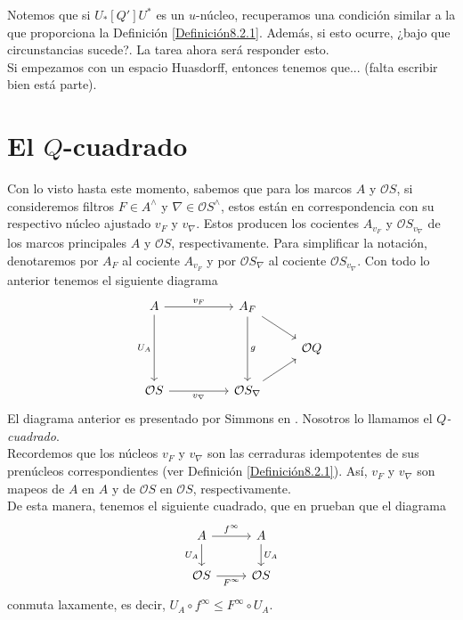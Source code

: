 Notemos que si $U_*[Q']U^*$ es un $u$-núcleo, recuperamos una condición similar a la que proporciona la Definición \ref{Definición8.2.1}. Además, si esto ocurre, ¿bajo que circunstancias 
sucede?. La tarea ahora será responder esto.\\

Si empezamos con un espacio Huasdorff, entonces tenemos que... (falta escribir bien está parte).

\section{El $Q$-cuadrado}\label{Qcuadrado}

Con lo visto hasta este momento, sabemos que para los marcos $A$ y $\mathcal{O}S$, si consideremos filtros $F\in A^\wedge$ y $\nabla\in \mathcal{O}S^\wedge$, estos están en correspondencia con su respectivo núcleo ajustado
$v_F$ y $v_\nabla$. Estos producen los cocientes $A_{v_F}$ y $\mathcal{O}S_{v_\nabla}$ de los marcos principales $A$ y $\mathcal{O}S$, respectivamente. Para simplificar la notación, denotaremos por $A_F$ al cociente $A_{v_F}$ 
y por $\mathcal{O}S_\nabla$ al cociente $\mathcal{O}S_{v_\nabla}$. Con todo lo anterior tenemos el siguiente diagrama
\[
\begin{tikzcd}
	A && {A_F} \\
	&&& {\mathcal{O}Q} \\
	{\mathcal{O}S} && {\mathcal{O}S_\nabla}
	\arrow["{v_F}", from=1-1, to=1-3]
	\arrow["{U_A}"', from=1-1, to=3-1]
	\arrow[from=1-3, to=2-4]
	\arrow["g", from=1-3, to=3-3]
	\arrow["{v_\nabla}"', from=3-1, to=3-3]
	\arrow[from=3-3, to=2-4]
\end{tikzcd}
\]
El diagrama anterior es presentado por Simmons en \cite{H.S.V}. Nosotros lo llamamos el \emph{$Q$-cuadrado}.\\

Recordemos que los núcleos $v_F$ y $v_\nabla$ son las cerraduras idempotentes de sus prenúcleos correspondientes (ver Definición \ref{Definición8.2.1}). Así, $v_F$ y $v_\nabla$ son mapeos de $A$ en $A$ y de $\mathcal{O}S$ en $\mathcal{O}S$, respectivamente.\\

De esta manera, tenemos el siguiente cuadrado, que en \cite{H.S.V} prueban que el diagrama
\[\begin{tikzcd}
	A & A \\
	{\mathcal{O}S} & {\mathcal{O}S}
	\arrow["{f^\infty}", from=1-1, to=1-2]
	\arrow["{U_A}"', from=1-1, to=2-1]
	\arrow["{U_A}", from=1-2, to=2-2]
	\arrow["{F^\infty}"', from=2-1, to=2-2]
\end{tikzcd}\]
conmuta laxamente, es decir, $U_A\circ f^\infty\leq F^\infty \circ U_A$.\\

